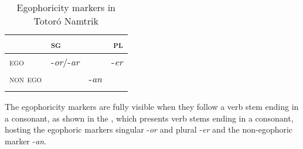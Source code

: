 \documentclass[output=paper]{langsci/langscibook}
\begin{document}
\begin{table}
\begin{tabularx}{.5\textwidth}{Xlcr}
\lsptoprule
  & \textsc{sg}  & & \textsc{pl} \\
\midrule
\textsc{ego} & -\textit{or}/-\textit{ar} & & -\textit{er}\\
\textsc{non ego} & & -\textit{an} & \\
\lspbottomrule
\end{tabularx}
\caption{Egophoricity markers in Totoró Namtrik}
\label{tab:gg1}
\end{table}

The egophoricity markers are fully visible when they follow a verb stem ending in a consonant, as shown in the , which presents verb stems ending in a consonant, hosting the egophoric markers singular -\textit{or} and plural -\textit{er} and the non-egophoric marker -\textit{an}.
\end{document}
